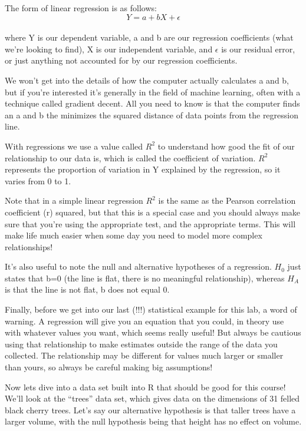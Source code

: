 \documentclass[
]{article}
\begin{document}
The form of linear regression is as follows: \[Y = a + bX + \epsilon\]\\
where Y is our dependent variable, a and b are our regression
coefficients (what we're looking to find), X is our independent
variable, and \(\epsilon\) is our residual error, or just anything not
accounted for by our regression coefficients.

We won't get into the details of how the computer actually calculates a
and b, but if you're interested it's generally in the field of machine
learning, often with a technique called gradient decent. All you need to
know is that the computer finds an a and b the minimizes the squared
distance of data points from the regression line.

With regressions we use a value called \(R^2\) to understand how good
the fit of our relationship to our data is, which is called the
coefficient of variation. \(R^2\) represents the proportion of variation
in Y explained by the regression, so it varies from 0 to 1.

Note that in a simple linear regression \(R^2\) is the same as the
Pearson correlation coefficient (r) squared, but that this is a special
case and you should always make sure that you're using the appropriate
test, and the appropriate terms. This will make life much easier when
some day you need to model more complex relationships!

It's also useful to note the null and alternative hypotheses of a
regression. \(H_0\) just states that b=0 (the line is flat, there is no
meaningful relationship), whereas \(H_A\) is that the line is not flat,
b does not equal 0.

Finally, before we get into our last (!!!) statistical example for this
lab, a word of warning. A regression will give you an equation that you
could, in theory use with whatever values you want, which seems really
useful! But always be cautious using that relationship to make estimates
outside the range of the data you collected. The relationship may be
different for values much larger or smaller than yours, so always be
careful making big assumptions!

Now lets dive into a data set built into R that should be good for this
course! We'll look at the ``trees'' data set, which gives data on the
dimensions of 31 felled black cherry trees. Let's say our alternative
hypothesis is that taller trees have a larger volume, with the null
hypothesis being that height has no effect on volume.
\end{document}
